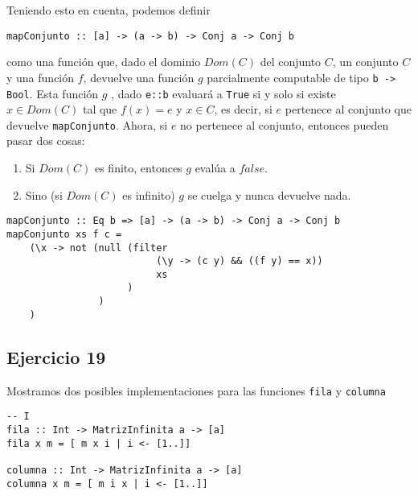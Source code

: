 \documentclass[10pt,a4paper]{article}
\begin{document}
Teniendo esto en cuenta, podemos definir
\begin{centrado}
\begin{verbatim}
mapConjunto :: [a] -> (a -> b) -> Conj a -> Conj b
\end{verbatim}
\end{centrado}

como una función que, dado el dominio $Dom(C)$ del conjunto $C$, un conjunto $C$ y una función $f$, devuelve una función $g$ parcialmente computable de tipo \texttt{b -> Bool}. Esta función $g$ , dado \texttt{e::b} evaluará a \texttt{True} si y solo si existe $x\in Dom(C)$ tal que $f(x) = e$ y $x\in C$, es decir, si $e$ pertenece al conjunto que devuelve \texttt{mapConjunto}. Ahora, si $e$ no pertenece al conjunto, entonces pueden pasar dos cosas:
\begin{enumerate}
    \item Si $Dom(C)$ es finito, entonces $g$ evalúa a $false$.
    \item Sino (si $Dom(C)$ es infinito) $g$ se cuelga y nunca devuelve nada.
\end{enumerate}

\begin{centrado}
    \begin{verbatim}
mapConjunto :: Eq b => [a] -> (a -> b) -> Conj a -> Conj b
mapConjunto xs f c = 
    (\x -> not (null (filter 
                          (\y -> (c y) && ((f y) == x)) 
                          xs
                     )
                )
    )
    \end{verbatim}
\end{centrado}

\subsection{Ejercicio 19}
Mostramos dos posibles implementaciones para las funciones \texttt{fila} y \texttt{columna}
\begin{centrado}
    \begin{verbatim}
-- I
fila :: Int -> MatrizInfinita a -> [a]
fila x m = [ m x i | i <- [1..]]

columna :: Int -> MatrizInfinita a -> [a]
columna x m = [ m i x | i <- [1..]]

    \end{verbatim}
\end{centrado}
\end{document}
